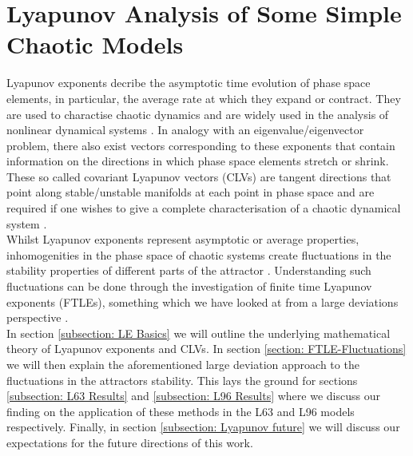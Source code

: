 \section{Lyapunov Analysis of Some Simple Chaotic Models} \label{section: Lyap-Analysis}

Lyapunov exponents decribe the asymptotic time evolution of phase space elements, in particular, the average rate at which they expand or contract. They are used to charactise chaotic dynamics and are widely used in the analysis of nonlinear dynamical systems \cite{Beck1995}. In analogy with an eigenvalue/eigenvector problem, there also exist vectors corresponding to these exponents that contain information on the directions in which phase space elements stretch or shrink. These so called covariant Lyapunov vectors (CLVs) are tangent directions that point along stable/unstable manifolds at each point in phase space and are required if one wishes to give a complete characterisation of a chaotic dynamical system \cite{Pikovsky2016a}.\\

Whilst Lyapunov exponents represent asymptotic or average properties, inhomogenities in the phase space of chaotic systems create fluctuations in the stability properties of different parts of the attractor \cite{Politi2014}. Understanding such fluctuations can be done through the investigation of finite time Lyapunov exponents (FTLEs), something which we have looked at from a large deviations perspective \cite{Touchette2009}.\\

In section \ref{subsection: LE Basics} we will outline the underlying mathematical theory of Lyapunov exponents and CLVs. In section \ref{section: FTLE-Fluctuations} we will then explain the aforementioned large deviation approach to the fluctuations in the attractors stability. This lays the ground for sections \ref{subsection: L63 Results} and \ref{subsection: L96 Results} where we discuss our finding on the application of these methods in the L63 and L96 models respectively. Finally, in section \ref{subsection: Lyapunov future} we will discuss our expectations for the future directions of this work.
